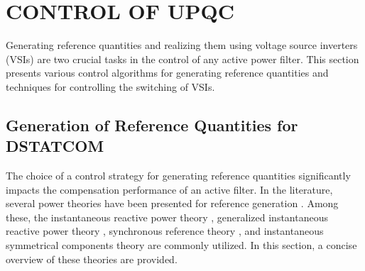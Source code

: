 \section{CONTROL OF UPQC}
Generating reference quantities and realizing them using voltage source inverters (VSIs) are two crucial tasks in the control of any active power filter. This section presents various control algorithms for generating reference quantities and techniques for controlling the switching of VSIs. 
\vspace*{-1.5cm}
\subsection {Generation of Reference Quantities for DSTATCOM}

The choice of a control strategy for generating reference quantities significantly impacts the compensation performance of an active filter. In the literature, several power theories have been presented for reference generation \cite{otto1978principles,gyugyi1979reactive,41770,akagi1986control,akagi1984instantaneous,akagi1983generalized,peng1996generalized,peng1998harmonic,ghosh1998new,847283,ghosh2000use,Benhabib2005353,chen1993reactive, 4283506}. Among these, the instantaneous reactive power theory \cite{akagi1986control,akagi1984instantaneous,akagi1983generalized}, generalized instantaneous reactive power theory \cite{peng1996generalized}, synchronous reference theory \cite{Benhabib2005353}, and instantaneous symmetrical components theory \cite{ghosh1998new,847283,ghosh2000use} are commonly utilized. In this section, a concise overview of these theories are provided.
\vspace*{-1.5cm}
